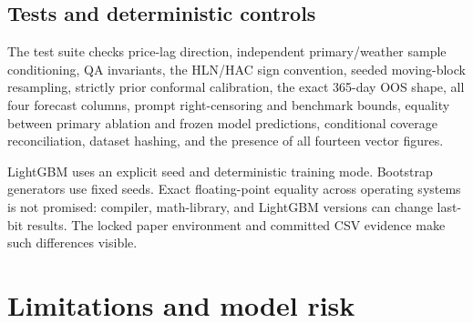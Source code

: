 \documentclass[11pt]{article}
\begin{document}
\subsection{Tests and deterministic controls}

The test suite checks price-lag direction, independent primary/weather sample
conditioning, QA invariants, the HLN/HAC sign convention, seeded moving-block
resampling, strictly prior conformal calibration, the exact 365-day OOS shape,
all four forecast columns, prompt right-censoring and benchmark bounds,
equality between primary ablation and frozen model predictions, conditional
coverage reconciliation, dataset hashing, and the presence of all fourteen
vector figures.

LightGBM uses an explicit seed and deterministic training mode.  Bootstrap
generators use fixed seeds.  Exact floating-point equality across operating
systems is not promised: compiler, math-library, and LightGBM versions can
change last-bit results.  The locked paper environment and committed CSV
evidence make such differences visible.

\section{Limitations and model risk}
\label{sec:limitations}
\end{document}
